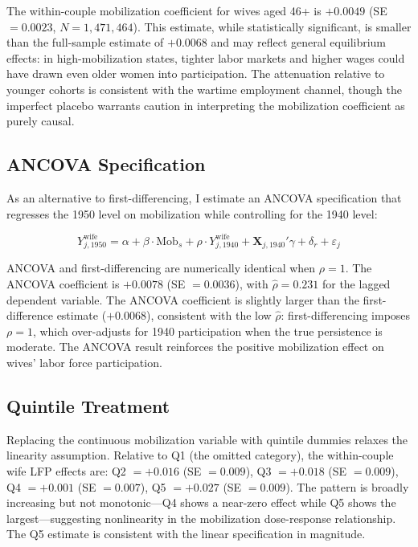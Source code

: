 \documentclass[12pt]{article}
\begin{document}
The within-couple mobilization coefficient for wives aged 46+ is $+0.0049$ (SE $= 0.0023$, $N = 1{,}471{,}464$). This estimate, while statistically significant, is smaller than the full-sample estimate of $+0.0068$ and may reflect general equilibrium effects: in high-mobilization states, tighter labor markets and higher wages could have drawn even older women into participation. The attenuation relative to younger cohorts is consistent with the wartime employment channel, though the imperfect placebo warrants caution in interpreting the mobilization coefficient as purely causal.

\subsection{ANCOVA Specification}

As an alternative to first-differencing, I estimate an ANCOVA specification that regresses the 1950 level on mobilization while controlling for the 1940 level:

\begin{equation}
Y_{j,1950}^{\text{wife}} = \alpha + \beta \cdot \text{Mob}_s + \rho \cdot Y_{j,1940}^{\text{wife}} + \mathbf{X}_{j,1940}' \gamma + \delta_r + \varepsilon_j
\end{equation}

\noindent ANCOVA and first-differencing are numerically identical when $\rho = 1$. The ANCOVA coefficient is $+0.0078$ (SE $= 0.0036$), with $\hat{\rho} = 0.231$ for the lagged dependent variable. The ANCOVA coefficient is slightly larger than the first-difference estimate ($+0.0068$), consistent with the low $\hat{\rho}$: first-differencing imposes $\rho = 1$, which over-adjusts for 1940 participation when the true persistence is moderate. The ANCOVA result reinforces the positive mobilization effect on wives' labor force participation.

\subsection{Quintile Treatment}

Replacing the continuous mobilization variable with quintile dummies relaxes the linearity assumption. Relative to Q1 (the omitted category), the within-couple wife LFP effects are: Q2 $= +0.016$ (SE $= 0.009$), Q3 $= +0.018$ (SE $= 0.009$), Q4 $= +0.001$ (SE $= 0.007$), Q5 $= +0.027$ (SE $= 0.009$). The pattern is broadly increasing but not monotonic---Q4 shows a near-zero effect while Q5 shows the largest---suggesting nonlinearity in the mobilization dose-response relationship. The Q5 estimate is consistent with the linear specification in magnitude.
\end{document}
